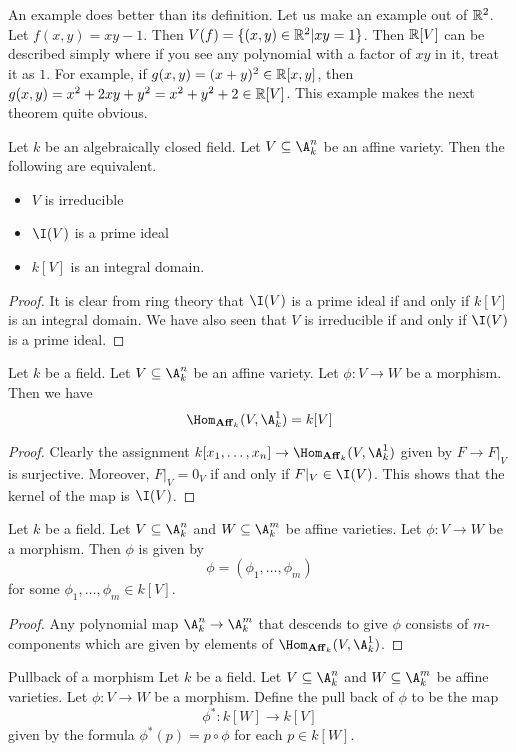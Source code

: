 \documentclass[a4paper]{article}
\begin{document}
An example does better than its definition. Let us make an example out of $\mathbb{R}^2$. Let $f(x,y)=xy-1$. Then $V(f)=\{(x,y)\in\mathbb{R}^2|xy=1\}$. Then $\mathbb{R}[V]$ can be described simply where if you see any polynomial with a factor of $xy$ in it, treat it as $1$. For example, if $g(x,y)=(x+y)^2\in\mathbb{R}[x,y]$, then $g(x,y)=x^2+2xy+y^2=x^2+y^2+2\in\mathbb{R}[V]$. This example makes the next theorem quite obvious. 

\begin{prp}{}{} Let $k$ be an algebraically closed field. Let $V\subseteq\A_k^n$ be an affine variety. Then the following are equivalent. 
\begin{itemize}
\item $V$ is irreducible
\item $\I(V)$ is a prime ideal
\item $k[V]$ is an integral domain. 
\end{itemize}
\begin{proof}
It is clear from ring theory that $\I(V)$ is a prime ideal if and only if $k[V]$ is an integral domain. We have also seen that $V$ is irreducible if and only if $\I(V)$ is a prime ideal. 
\end{proof}
\end{prp}

\begin{prp}{}{} Let $k$ be a field. Let $V\subseteq\A_k^n$ be an affine variety. Let $\phi:V\to W$ be a morphism. Then we have $$\Hom_{\bold{Aff}_k}(V,\A_k^1)=k[V]$$ 
\begin{proof}
Clearly the assignment $k[x_1,\dots,x_n]\to\Hom_{\bold{Aff}_k}(V,\A_k^1)$ given by $F\to F|_V$ is surjective. Moreover, $F|_V=0_V$ if and only if $F|_V\in\I(V)$. This shows that the kernel of the map is $\I(V)$. 
\end{proof}
\end{prp}

\begin{lmm}{}{} Let $k$ be a field. Let $V\subseteq\A_k^n$ and $W\subseteq\A_k^m$ be affine varieties. Let $\phi:V\to W$ be a morphism. Then $\phi$ is given by $$\phi=(\phi_1,\dots,\phi_m)$$ for some $\phi_1,\dots,\phi_m\in k[V]$. 
\begin{proof}
Any polynomial map $\A_k^n\to\A_k^m$ that descends to give $\phi$ consists of $m$-components which are given by elements of $\Hom_{\bold{Aff}_k}(V,\A_k^1)$. 
\end{proof}
\end{lmm}

\begin{defn}{Pullback of a morphism}{} Let $k$ be a field. Let $V\subseteq\A_k^n$ and $W\subseteq\A_k^m$ be affine varieties. Let $\phi:V\to W$ be a morphism. Define the pull back of $\phi$ to be the map $$\phi^\ast:k[W]\to k[V]$$ given by the formula $\phi^\ast(p)=p\circ\phi$ for each $p\in k[W]$. 
\end{defn}
\end{document}
